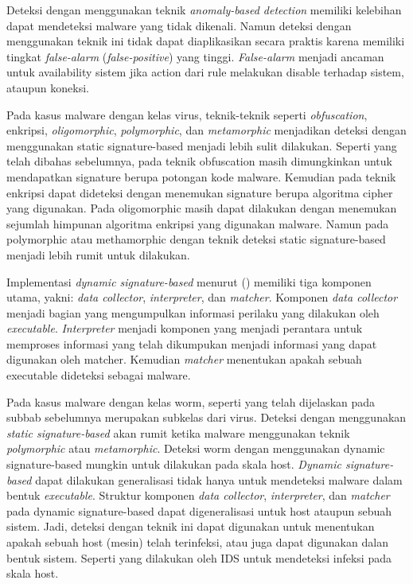 Deteksi dengan menggunakan teknik \textit{anomaly-based detection} memiliki kelebihan dapat mendeteksi malware yang tidak dikenali. Namun deteksi dengan menggunakan teknik ini tidak dapat diaplikasikan secara praktis karena memiliki tingkat \textit{false-alarm} (\textit{false-positive}) yang tinggi. \textit{False-alarm} menjadi ancaman untuk availability sistem jika action dari rule melakukan disable terhadap sistem, ataupun koneksi.

Pada kasus malware dengan kelas virus, teknik-teknik seperti \textit{obfuscation}, enkripsi, \textit{oligomorphic}, \textit{polymorphic}, dan \textit{metamorphic} menjadikan deteksi dengan menggunakan static signature-based menjadi lebih sulit dilakukan. Seperti yang telah dibahas sebelumnya, pada teknik obfuscation masih dimungkinkan untuk mendapatkan signature berupa potongan kode malware. Kemudian pada teknik enkripsi dapat dideteksi dengan menemukan signature berupa algoritma cipher yang digunakan. Pada oligomorphic masih dapat dilakukan dengan menemukan sejumlah himpunan algoritma enkripsi yang digunakan malware. Namun pada polymorphic atau methamorphic dengan teknik deteksi static signature-based menjadi lebih rumit untuk dilakukan.

Implementasi \textit{dynamic signature-based} menurut (\cite{6620049}) memiliki tiga komponen utama, yakni: \textit{data collector}, \textit{interpreter}, dan \textit{matcher}. Komponen \textit{data collector} menjadi bagian yang mengumpulkan informasi perilaku yang dilakukan oleh \textit{executable}. \textit{Interpreter} menjadi komponen yang menjadi perantara untuk memproses informasi yang telah dikumpukan menjadi informasi yang dapat digunakan oleh matcher. Kemudian \textit{matcher} menentukan apakah sebuah executable dideteksi sebagai malware.

Pada kasus malware dengan kelas worm, seperti yang telah dijelaskan pada subbab sebelumnya merupakan subkelas dari virus. Deteksi dengan menggunakan \textit{static signature-based} akan rumit ketika malware menggunakan teknik \textit{polymorphic} atau \textit{metamorphic}. Deteksi worm dengan menggunakan dynamic signature-based mungkin untuk dilakukan pada skala host. \textit{Dynamic signature-based} dapat dilakukan generalisasi tidak hanya untuk mendeteksi malware dalam bentuk \textit{executable}. Struktur komponen \textit{data collector}, \textit{interpreter}, dan \textit{matcher} pada dynamic signature-based dapat digeneralisasi untuk host ataupun sebuah sistem. Jadi, deteksi dengan teknik ini dapat digunakan untuk menentukan apakah sebuah host (mesin) telah terinfeksi, atau juga dapat digunakan dalan bentuk sistem. Seperti yang dilakukan oleh IDS untuk mendeteksi infeksi pada skala host.

